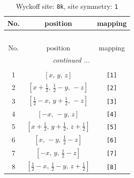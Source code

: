 \documentclass[fleqn,8pt]{jsarticle}
\begin{document}
\renewcommand{\arraystretch}{1.2}
\begin{longtable}{ccc}
\caption{Wyckoff site: {\tt 8k}, site symmetry: {\tt 1}}
 \\
 \hline \hline
No. & position & mapping \\ \hline \endfirsthead

\multicolumn{2}{l}{\tablename\ \thetable{}} \\
 \hline \hline
No. & position & mapping \\ \hline \endhead

 \hline \hline
\multicolumn{2}{r}{\footnotesize\it continued ...} \\ \endfoot

 \hline \hline
\multicolumn{2}{r}{} \\ \endlastfoot

1 & $\left[ x,\, y,\, z \right]$ & {\tt [1]} \\ \hline
2 & $\left[ x + \frac{1}{2},\, \frac{1}{2} - y,\, - z \right]$ & {\tt [2]} \\ \hline
3 & $\left[ \frac{1}{2} - x,\, y + \frac{1}{2},\, - z \right]$ & {\tt [3]} \\ \hline
4 & $\left[ - x,\, - y,\, z \right]$ & {\tt [4]} \\ \hline
5 & $\left[ x + \frac{1}{2},\, y + \frac{1}{2},\, z + \frac{1}{2} \right]$ & {\tt [5]} \\ \hline
6 & $\left[ x,\, - y,\, \frac{1}{2} - z \right]$ & {\tt [6]} \\ \hline
7 & $\left[ - x,\, y,\, \frac{1}{2} - z \right]$ & {\tt [7]} \\ \hline
8 & $\left[ \frac{1}{2} - x,\, \frac{1}{2} - y,\, z + \frac{1}{2} \right]$ & {\tt [8]} \\
\end{longtable}
\end{document}

